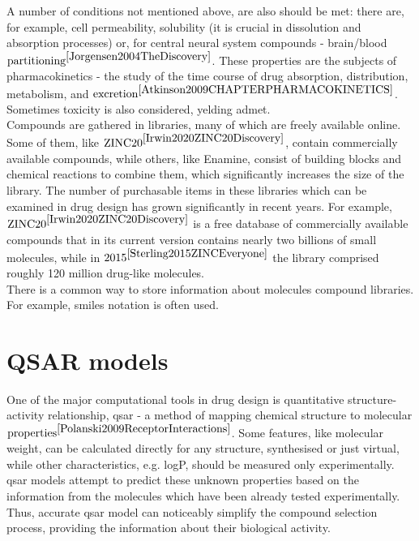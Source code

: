 A number of conditions not mentioned above, are also should be met: there are, for example, cell permeability, solubility (it is crucial in dissolution and absorption processes) or, for central neural system compounds - brain/blood $\text{partitioning}^{\cite{Jorgensen2004TheDiscovery}}$.
These properties are the subjects of pharmacokinetics - the study of the
time course of drug absorption, distribution, metabolism, and $\text{excretion}^{\cite{Atkinson2009CHAPTERPHARMACOKINETICS}}$. Sometimes toxicity is also considered, yelding \acrshort{admet}. \\

Compounds are gathered in libraries, many of which are freely available online.
Some of them, like $\text{ZINC20}^{\cite{Irwin2020ZINC20Discovery}}$, contain commercially available compounds, while others, like Enamine, consist of building blocks and chemical reactions to combine them, which significantly increases the size of the library.
The number of purchasable items in these libraries which can be examined in drug design has grown significantly in recent years.
For example, $\text{ZINC20}^{\cite{Irwin2020ZINC20Discovery}}$ is a free database of commercially available compounds that in its current version contains nearly two billions of small molecules, while in $\text{2015}^{\cite{Sterling2015ZINCEveryone}}$ the library comprised roughly 120 million drug-like molecules.\\

There is a common way to store information about molecules compound libraries.
For example, \acrshort{smiles} notation is often used.\\

\section{QSAR models}
One of the major computational tools in drug design is quantitative structure-activity relationship, \acrshort{qsar} - a method of mapping chemical structure to molecular $\text{properties}^{\cite{Polanski2009ReceptorInteractions}}$. 
Some features, like molecular weight, can be calculated directly for any structure, synthesised or just virtual, while other characteristics, e.g. logP, should be measured only experimentally.
\acrshort{qsar} models attempt to predict these unknown properties based on the information from the molecules which have been already tested experimentally.
Thus, accurate \acrshort{qsar} model can noticeably simplify the compound selection process, providing the information about their biological activity.\\


